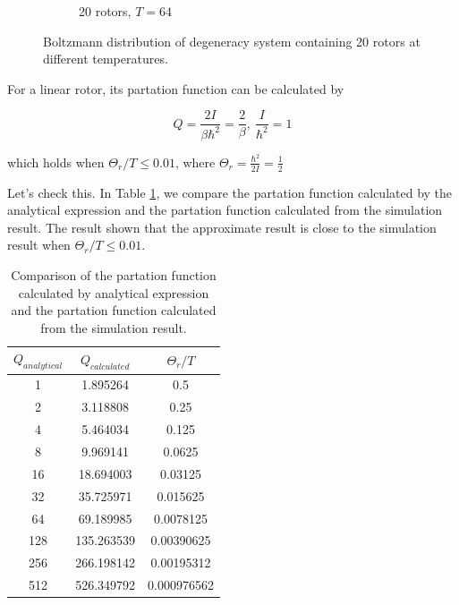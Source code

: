 \documentclass{assignmeownt}
\begin{document}
\begin{figure}
\begin{subfigure}[b]{0.4\textwidth}
      \caption{20 rotors, $T=64$}
  \end{subfigure}
     \caption{Boltzmann distribution of degeneracy system containing 20 rotors at different temperatures.}
     \label{fig:boltzmann_rotor_degeneracy}
\end{figure}


For a linear rotor, its partation function can be calculated by

$$Q=\frac{2I}{\beta\hbar^2}=\frac{2}{\beta},\ \frac{I}{\hbar^2}=1$$

which holds when $\Theta_r/T\leq 0.01$, where $\Theta_r=\frac{\hbar^2}{2I}=\frac{1}{2}$

Let's check this. In Table \ref{tab:partation function}, we compare the partation function calculated by the analytical expression and the partation function calculated from the simulation result. The result shown that the approximate result is close to the simulation result when $\Theta_r/T\leq 0.01$.

\begin{table}[]
  \centering
  \caption{Comparison of the partation function calculated by analytical expression and the partation function calculated from the simulation result.}
  \begin{tabular}{@{}ccc@{}}
  
  \toprule
  
  $Q_{analytical}$ & $Q_{calculated}$ & ${\Theta_r}/T$ \\ \midrule
  1   & 1.895264   & 0.5         \\
  2   & 3.118808   & 0.25        \\
  4   & 5.464034   & 0.125       \\
  8   & 9.969141   & 0.0625      \\
  16  & 18.694003  & 0.03125     \\
  32  & 35.725971  & 0.015625    \\
  64  & 69.189985  & 0.0078125   \\
  128 & 135.263539 & 0.00390625  \\
  256 & 266.198142 & 0.00195312  \\
  512 & 526.349792 & 0.000976562 \\ \bottomrule
  \end{tabular}\label{tab:partation function}
  \end{table}
\end{document}

